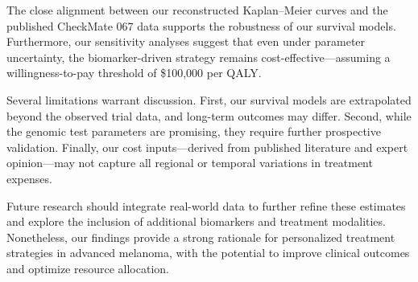 \documentclass[preprint, 3p,
authoryear]{elsarticle} %
\begin{document}
The close alignment between our reconstructed Kaplan--Meier curves and
the published CheckMate 067 data supports the robustness of our survival
models. Furthermore, our sensitivity analyses suggest that even under
parameter uncertainty, the biomarker-driven strategy remains
cost-effective---assuming a willingness-to-pay threshold of \$100,000
per QALY.

Several limitations warrant discussion. First, our survival models are
extrapolated beyond the observed trial data, and long-term outcomes may
differ. Second, while the genomic test parameters are promising, they
require further prospective validation. Finally, our cost
inputs---derived from published literature and expert opinion---may not
capture all regional or temporal variations in treatment expenses.

Future research should integrate real-world data to further refine these
estimates and explore the inclusion of additional biomarkers and
treatment modalities. Nonetheless, our findings provide a strong
rationale for personalized treatment strategies in advanced melanoma,
with the potential to improve clinical outcomes and optimize resource
allocation.

\renewcommand\refname{References}

\end{document}
